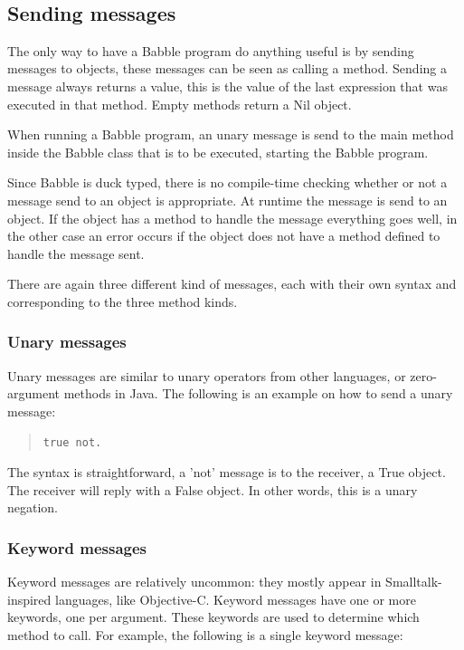 \documentclass[a4paper]{article}
\begin{document}
\

\subsection{Sending messages}

The only way to have a Babble program do anything useful is by sending messages to objects, these messages can be seen as calling a method. Sending a message always returns a value, this is the value of the last expression that was executed in that method. Empty methods return a Nil object.

When running a Babble program, an unary message is send to the main method inside the Babble class that is to be executed, starting the Babble program.

Since Babble is duck typed, there is no compile-time checking whether or not a message send to an object is appropriate. At runtime the message is send to an object. If the object has a method to handle the message everything goes well, in the other case an error occurs if the object does not have a method defined to handle the message sent.

There are again three different kind of messages, each with their own syntax and corresponding to the three method kinds.

\subsubsection{Unary messages}

Unary messages are similar to unary operators from other languages, or zero-argument methods in Java.
The following is an example on how to send a unary message:

\begin{quote}
\begin{lstlisting}
true not.
\end{lstlisting}
\end{quote}

The syntax is straightforward, a 'not' message is to the receiver, a True object.
The receiver will reply with a False object. In other words, this is a unary negation.

\subsubsection{Keyword messages}

Keyword messages are relatively uncommon: they mostly appear in Smalltalk-inspired languages, like Objective-C.
Keyword messages have one or more keywords, one per argument.
These keywords are used to determine which method to call.
For example, the following is a single keyword message:
\end{document}
